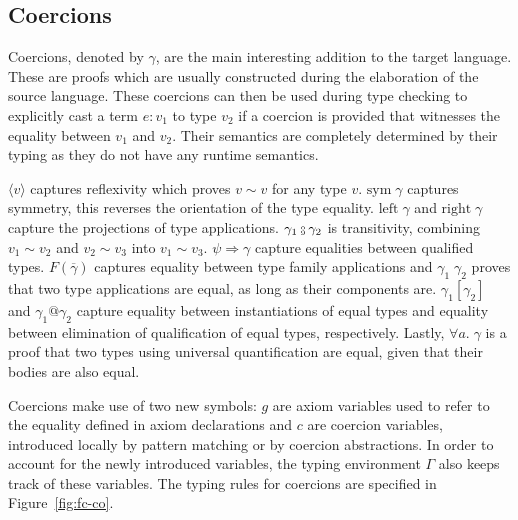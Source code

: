 \subsection{Coercions}

Coercions, denoted by $\gamma$, are the main interesting addition to the target
language. These are proofs which are usually constructed during the elaboration
of the source language. These coercions can then be used during type checking to
explicitly cast a term $e : v_1$ to type $v_2$ if a coercion is provided that
witnesses the equality between $v_1$ and $v_2$. Their semantics are completely
determined by their typing as they do not have any runtime semantics.

$\langle v \rangle$ captures reflexivity which proves $v \sim v$ for any
type $v$. $\text{sym} \; \gamma$ captures symmetry, this reverses the
orientation of the type equality. $\text{left} \; \gamma$ and $\text{right} \;
\gamma$ capture the projections of type applications.
$\gamma_1 \fctrans \gamma_2$ is transitivity, combining $v_1 \sim v_2$ and $v_2
\sim v_3$ into $v_1 \sim v_3$. $\psi \Rightarrow \gamma$ capture equalities
between qualified types. $F(\overline{\gamma})$ captures equality between type
family applications and $\gamma_1 \; \gamma_2$ proves that two type
applications are equal, as long as their components are.
$\gamma_1[\gamma_2]$ and $\gamma_1@\gamma_2$ capture equality between
instantiations of equal types and equality between elimination of qualification
of equal types, respectively. Lastly, $\forall a. \; \gamma$ is a proof that
two types using universal quantification are equal, given that their bodies are
also equal.

Coercions make use of two new symbols: $g$ are axiom variables used to refer to the
equality defined in axiom declarations and $c$ are coercion variables, introduced
locally by pattern matching or by coercion abstractions. In order to account for the
newly introduced variables, the typing environment $\Gamma$ also keeps track
of these variables. The typing rules for coercions are specified in
Figure~\ref{fig:fc-co}.

